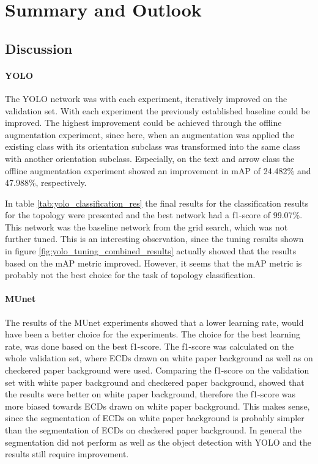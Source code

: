 \chapter{Summary and Outlook}

\section{Discussion}

\subsubsection{\ac{YOLO}}

The \ac{YOLO} network was with each experiment, iteratively improved on the validation set.
With each experiment the previously established baseline could be improved.
The highest improvement could be achieved through the offline augmentation experiment, since here, when an augmentation was applied the existing class with its orientation subclass was transformed into the same class with another orientation subclass.
Especially, on the text and arrow class the offline augmentation experiment showed an improvement in \ac{mAP} of 24.482\% and 47.988\%, respectively.

In table \ref{tab:yolo_classification_res} the final results for the classification results for the topology were presented and the best network had a f1-score of 99.07\%.
This network was the baseline network from the grid search, which was not further tuned.
This is an interesting observation, since the tuning results shown in figure \ref{fig:yolo_tuning_combined_results} actually showed that the results based on the \ac{mAP} metric improved.
However, it seems that the \ac{mAP} metric is probably not the best choice for the task of topology classification.

\subsubsection{\ac{MUnet}}

The results of the \ac{MUnet} experiments showed that a lower learning rate, would have been a better choice for the experiments.
The choice for the best learning rate, was done based on the best f1-score.
The f1-score was calculated on the whole validation set, where \acp{ECD} drawn on white paper background as well as on checkered paper background were used.
Comparing the f1-score on the validation set with white paper background and checkered paper background, showed that the results were better on white paper background, therefore the f1-score was more biased towards \acp{ECD} drawn on white paper background.
This makes sense, since the segmentation of \acp{ECD} on white paper background is probably simpler than the segmentation of \acp{ECD} on checkered paper background.
In general the segmentation did not perform as well as the object detection with \ac{YOLO} and the results still require improvement.

